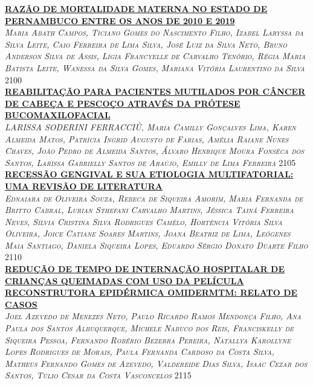 \noindent \textsc{\hyperlink{trabalhos/251687.pdf.1}{\textbf{RAZÃO DE MORTALIDADE MATERNA NO ESTADO DE PERNAMBUCO ENTRE OS ANOS DE 2010 E 2019 }}}\\ 
\noindent \textsc{\textit{Maria Abath Campos, Ticiano Gomes do Nascimento Filho, Izabel Laryssa da Silva Leite, Caio Ferreira de Lima Silva, José Luiz da Silva Neto, Bruno Anderson Silva de Assis, Lígia Francyelle de Carvalho Tenório, Régia Maria Batista Leite, Wanessa da Silva Gomes, Mariana Vitória Laurentino da Silva}} \hfill 2100\\ 

\noindent \textsc{\hyperlink{trabalhos/251782.pdf.1}{\textbf{REABILITAÇÃO PARA PACIENTES MUTILADOS POR CÂNCER DE CABEÇA E PESCOÇO ATRAVÉS DA PRÓTESE BUCOMAXILOFACIAL}}}\\ 
\noindent \textsc{\textit{LARISSA SODERINI FERRACCIÙ, Maria Camilly Gonçalves Lima, Karen Almeida Matos, Patrícia Ingrid Augusto de Farias, Amélia Raiane Nunes Chaves, João Pedro de Almeida Santos, Álvaro Henrique Moura Fonsêca dos Santos, Larissa Gabrielly Santos de Araújo, Emilly de Lima Ferreira}} \hfill 2105\\ 

\noindent \textsc{\hyperlink{trabalhos/250353.pdf.1}{\textbf{RECESSÃO GENGIVAL E SUA ETIOLOGIA MULTIFATORIAL: UMA REVISÃO DE LITERATURA}}}\\ 
\noindent \textsc{\textit{Ednaiara de Oliveira Souza, Rebeca de Siqueira Amorim, Maria Fernanda de Britto Cabral, Lurian Sthefani Carvalho Martins, Jéssica Tainá Ferreira Neves, Sílvia Cristina Silva Rodrigues Camêlo, Hortência Vitória Silva Oliveira, Joice Catiane Soares Martins, Joana Beatriz de Lima, Leógenes Maia Santiago, Daniela Siqueira Lopes, Eduardo Sérgio Donato Duarte Filho}} \hfill 2110\\ 

\noindent \textsc{\hyperlink{trabalhos/250365.pdf.1}{\textbf{REDUÇÃO DE TEMPO DE INTERNAÇÃO HOSPITALAR DE CRIANÇAS QUEIMADAS COM USO DA PELÍCULA RECONSTRUTORA EPIDÉRMICA OMIDERMTM: RELATO DE CASOS}}}\\ 
\noindent \textsc{\textit{Joel Azevedo de Menezes Neto, Paulo Ricardo Ramos Mendonça Filho, Ana Paula dos Santos Albuquerque, Michele Nabuco dos Reis, Franciskelly de Siqueira Pessoa, Fernando Robério Bezerra Pereira, Natallya Karollyne Lopes Rodrigues de Morais, Paula Fernanda Cardoso da Costa Silva, Matheus Fernando Gomes de Azevedo, Valdereide Dias Silva, Isaac Cezar dos Santos, Túlio Cesar da Costa Vasconcelos}} \hfill 2115\\ 

